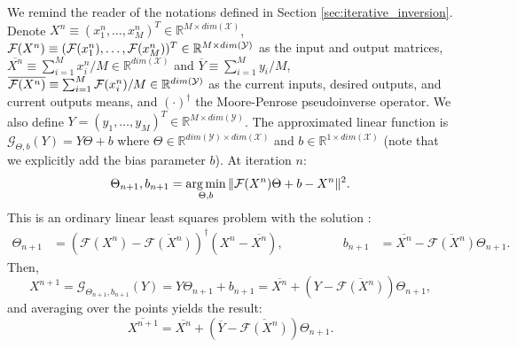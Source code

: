 \documentclass[nohyperref]{article}
\begin{document}
We remind the reader of the notations defined in Section \ref{sec:iterative_inversion}. Denote $X^n\equiv(x^n_1,\dots,x^n_M)^T\in\mathbb{R}^{M \times dim(\mathcal{X})}$, $\mathcal{F}(X^n)\equiv(\mathcal{F}(x_1^n),\dots,\mathcal{F}(x_M^n))^T\in\mathbb{R}^{M \times dim(\mathcal{Y})}$ as the input and output matrices, $\overline{X^n}\equiv\sum_{i=1}^M x_i^n / M\in\mathbb{R}^{dim(\mathcal{X})}$ and $\overline{Y}\equiv\sum_{i=1}^M y_i / M$, $\overline{\mathcal{F}(X^n)}\equiv\sum_{i=1}^M \mathcal{F}(x_i^n) / M\in\mathbb{R}^{dim(\mathcal{Y})}$ as the current inputs, desired outputs, and current outputs means,  and $(\cdot)^\dagger$ the Moore-Penrose pseudoinverse operator. We also define $Y=(y_1,\dots,y_M)^T\in\mathbb{R}^{M\times dim(\mathcal{Y})}$. The approximated linear function is $\mathcal{G}_{\Theta,b}(Y)=Y\Theta + b$ where $\Theta\in\mathbb{R}^{dim(\mathcal{Y})\times dim(\mathcal{X})}$ and $b\in\mathbb{R}^{1 \times dim(\mathcal{X})}$ (note that we explicitly add the bias parameter $b$). At iteration $n$:
\begin{align*}
    \Theta_{n+1},b_{n+1}=\operatorname*{arg\,min}_{\Theta, b} \| \mathcal{F}(X^n) \Theta + b - X^n \| ^2 .
\end{align*}
This is an ordinary linear least squares problem with the solution \citep[Section 3.11.1]{linearregbook2003}:
\begin{equation}\label{eq:theta_b}
\begin{aligned}
 \Theta_{n+1} &= (\mathcal{F}(X^n)-\overline{\mathcal{F}(X^n)})^{\dagger}(X^n-\overline{X^n}), \qquad\qquad&  b_{n+1} &= \overline{X^n}-\overline{\mathcal{F}(X^n)}\Theta_{n+1}.
\end{aligned}
\end{equation}
Then,
\begin{equation*}
X^{n+1} = \mathcal{G}_{\Theta_{n+1},b_{n+1}}(Y)=Y\Theta_{n+1}+b_{n+1}=\overline{X^n}+(Y-\overline{\mathcal{F}(X^n)})\Theta_{n+1},
\end{equation*}
and averaging over the points yields the result:
\begin{equation*}
\overline{X^{n+1}} =\overline{X^n}+(\overline{Y}-\overline{\mathcal{F}(X^n)})\Theta_{n+1}.
\end{equation*}
\end{document}
